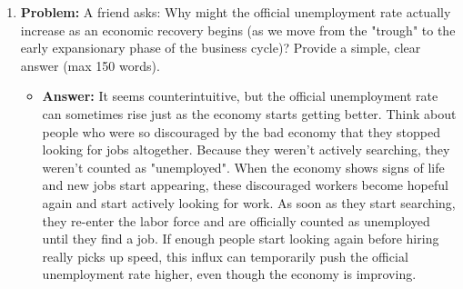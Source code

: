 \documentclass{article}
\begin{document}
\begin{enumerate}[label=\arabic*.]
\item \textbf{Problem:} A friend asks: Why might the official unemployment rate actually increase as an economic recovery begins (as we move from the "trough" to the early expansionary phase of the business cycle)? Provide a simple, clear answer (max 150 words).
\begin{itemize}
\item \textbf{Answer:} It seems counterintuitive, but the official unemployment rate can sometimes rise just as the economy starts getting better. Think about people who were so discouraged by the bad economy that they stopped looking for jobs altogether. Because they weren't actively searching, they weren't counted as "unemployed". When the economy shows signs of life and new jobs start appearing, these discouraged workers become hopeful again and start actively looking for work. As soon as they start searching, they re-enter the labor force and are officially counted as unemployed until they find a job. If enough people start looking again before hiring really picks up speed, this influx can temporarily push the official unemployment rate higher, even though the economy is improving.
\end{itemize}
\end{enumerate}
\end{document}
